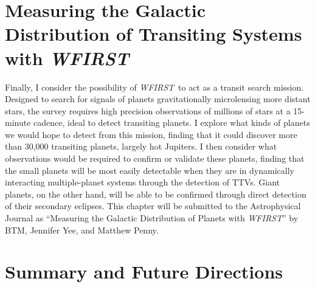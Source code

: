 \documentclass[12pt]{caltech_thesis}
\newcommand{\WF}{{\textit {WFIRST}}}
\begin{document}


\chapter{Measuring the Galactic Distribution of Transiting Systems with \WF}
\label{chap:wfirst}
Finally, I consider the possibility of \WF\ to act as a transit search mission.
Designed to search for signals of planets gravitationally microlensing more distant stars, the survey
requires high precision observations of millions of stars at a 15-minute cadence, ideal to detect
transiting planets.
I explore what kinds of planets we would hope to detect from this mission, finding that it could discover more than 30,000
transiting planets, largely hot Jupiters.
I then consider what observations would be required to confirm or validate these planets, finding that the small planets
will be most easily detectable when they are in dynamically interacting multiple-planet systems through the detection of
TTVs.
Giant planets, on the other hand, will be able to be confirmed through direct detection of their secondary eclipses.
This chapter will be submitted to the Astrophysical Journal as ``Measuring the Galactic Distribution of Planets with \WF'' by
BTM, Jennifer Yee, and Matthew Penny.








\chapter{Summary and Future Directions}
\label{chap:summary}





\printbibliography[]
%





\end{document}
